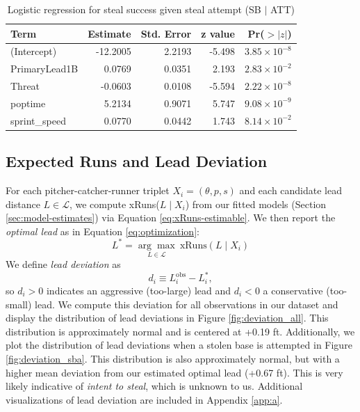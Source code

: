 \documentclass[12pt,letterpaper]{article}
\begin{document}
\begin{table}[htbp]
\centering
\caption{Logistic regression for steal success given steal attempt (SB $\mid$ ATT)}
\label{tab:sb_att}
\begin{tabular}{lrrrr}
\toprule
Term & Estimate & Std. Error & z value & Pr($>|z|$) \\
\midrule
(Intercept)   & -12.2005 & 2.2193 &  -5.498 & $3.85\times10^{-8}$ \\
PrimaryLead1B &   0.0769 & 0.0351 &   2.193 & $2.83\times10^{-2}$ \\
Threat        &  -0.0603 & 0.0108 &  -5.594 & $2.22\times10^{-8}$ \\
poptime       &   5.2134 & 0.9071 &   5.747 & $9.08\times10^{-9}$ \\
sprint\_speed &   0.0770 & 0.0442 &   1.743 & $8.14\times10^{-2}$ \\
\bottomrule
\end{tabular}
\end{table}

\subsection{Expected Runs and Lead Deviation}

For each pitcher-catcher-runner triplet $X_i = (\theta, p, s)$ and each candidate lead distance $L \in \mathcal{L}$, we compute xRuns($L \mid X_i$) from our fitted models (Section \ref{sec:model-estimates}) via Equation \ref{eq:xRuns-estimable}. We then report the \emph{optimal lead} as in Equation \ref{eq:optimization}:
\[L^* = \underset{L\in \mathcal{L}}{\arg\max}\ \text{xRuns}(L \mid X_i)\]
We define \emph{lead deviation} as
\begin{equation}
    d_i \equiv L_i^\text{obs} - L_i^*, \label{eq:deviation}
\end{equation}
so $d_i > 0$ indicates an aggressive (too-large) lead and $d_i <0$ a conservative (too-small) lead. We compute this deviation for all observations in our dataset and display the distribution of lead deviations in Figure \ref{fig:deviation_all}. This distribution is approximately normal and is centered at +0.19 ft. Additionally, we plot the distribution of lead deviations when a stolen base is attempted in Figure \ref{fig:deviation_sba}. This distribution is also approximately normal, but with a higher mean deviation from our estimated optimal lead (+0.67 ft). This is very likely indicative of \emph{intent to steal}, which is unknown to us. Additional visualizations of lead deviation are included in Appendix \ref{app:a}.
\end{document}
